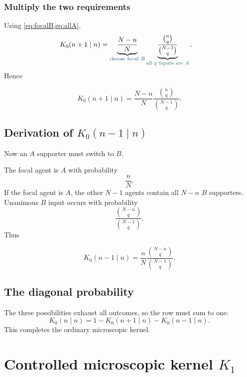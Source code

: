 \documentclass[11pt,a4paper]{article}
\newcommand{\1}{\mathbbm{1}}
\begin{document}
\subsubsection{Multiply the two requirements}

Using \cref{eq:focalB,eq:allA},
\begin{align}
K_0(n+1\mid n)
&=
\underbrace{\frac{N-n}{N}}_{\color{deepblue}{\text{choose focal }B}}
\underbrace{\frac{\binom{n}{q}}{\binom{N-1}{q}}}_{\color{deepgreen}{\text{all }q\text{ inputs are }A}}.
\end{align}
Hence
\begin{resultbox}
\begin{equation}
\boxed{
K_0(n+1\mid n)
=
\frac{N-n}{N}
\frac{\binom{n}{q}}{\binom{N-1}{q}}.}
\label{eq:k0plus}
\end{equation}
\end{resultbox}

\subsection{Derivation of $K_0(n-1\mid n)$}

Now an $A$ supporter must switch to $B$.

The focal agent is $A$ with probability
\[
\frac{n}{N}.
\]
If the focal agent is $A$, the other $N-1$ agents contain all $N-n$ $B$ supporters. Unanimous $B$ input occurs with probability
\[
\frac{\binom{N-n}{q}}{\binom{N-1}{q}}.
\]
Thus
\begin{resultbox}
\begin{equation}
\boxed{
K_0(n-1\mid n)
=
\frac{n}{N}
\frac{\binom{N-n}{q}}{\binom{N-1}{q}}.}
\label{eq:k0minus}
\end{equation}
\end{resultbox}

\subsection{The diagonal probability}

The three possibilities exhaust all outcomes, so the row must sum to one:
\begin{equation}
\boxed{
K_0(n\mid n)
=1-K_0(n+1\mid n)-K_0(n-1\mid n).}
\label{eq:k0diag}
\end{equation}
This completes the ordinary microscopic kernel.

\section{Controlled microscopic kernel $K_1$}
\end{document}
